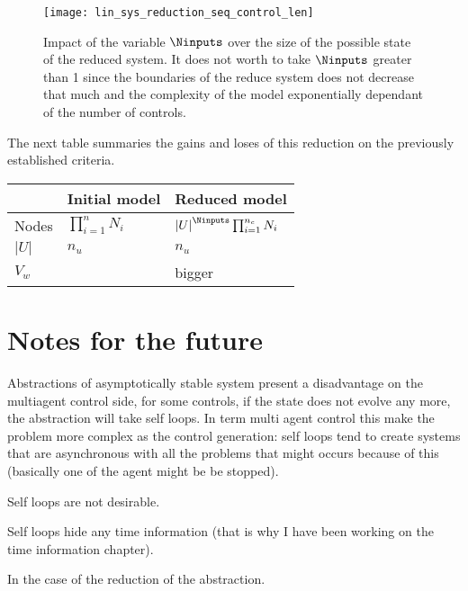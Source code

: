 \begin{figure}[!ht]
  \centering
  \texttt{[image: lin\_sys\_reduction\_seq\_control\_len]}
  \caption{Impact of the variable $\Ninputs$ over the size of the possible state of the reduced system. It does not worth to take $\Ninputs$ greater than 1 since the boundaries of the reduce system does not decrease that much and the complexity of the model exponentially dependant of the number of controls.}
  \label{reduced_system_bounds}
\end{figure}

The next table summaries the gains and loses of this reduction on the previously established criteria.

\begin{tabular}{ l|ll }
& Initial model & Reduced model\\ \hline
Nodes & $\prod_{i=1}^n N_i$ & $\left | U \right |^{\Ninputs} \prod_{i=1}^{n_c} N_i $\\ 
$|U|$ & $n_u$ & $n_u$\\
$V_w$ &  & bigger \\
\end{tabular}

\section{Notes for the future}
Abstractions of asymptotically stable system present a disadvantage on the multiagent control side, for some controls, if the state does not evolve any more, the abstraction will take self loops.
In term multi agent control this make the problem more complex as the control generation: self loops tend to create systems that are asynchronous with all the problems that might occurs because of this (basically one of the agent might be be stopped).

Self loops are not desirable.

Self loops hide any time information (that is why I have been working on the time information chapter).

In the case of the reduction of the abstraction.